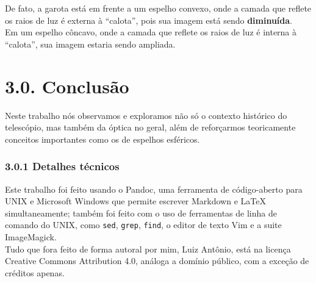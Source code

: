 \documentclass[
  a4paper]{article}
\begin{document}
De fato, a garota está em frente a um espelho convexo, onde a camada que
reflete os raios de luz é externa à ``calota'', pois sua imagem está
sendo \textbf{diminuída}.\\
Em um espelho côncavo, onde a camada que reflete os raios de luz é
interna à ``calota'', sua imagem estaria sendo ampliada.

\newpage

\hypertarget{conclusuxe3o}{%
\section{3.0. Conclusão}\label{conclusuxe3o}}

Neste trabalho nós observamos e exploramos não só o contexto histórico
do telescópio, mas também da óptica no geral, além de reforçarmos
teoricamente conceitos importantes como os de espelhos esféricos.

\hypertarget{detalhes-tuxe9cnicos}{%
\subsubsection{3.0.1 Detalhes técnicos}\label{detalhes-tuxe9cnicos}}

Este trabalho foi feito usando o Pandoc, uma ferramenta de código-aberto
para UNIX e Microsoft Windows que permite escrever Markdown e LaTeX
simultaneamente; também foi feito com o uso de ferramentas de linha de
comando do UNIX, como \texttt{sed}, \texttt{grep}, \texttt{find}, o
editor de texto Vim e a suite ImageMagick.\\
Tudo que fora feito de forma autoral por mim, Luiz Antônio, está na
licença Creative Commons Attribution 4.0, análoga a domínio público, com
a exceção de créditos apenas.
\end{document}
